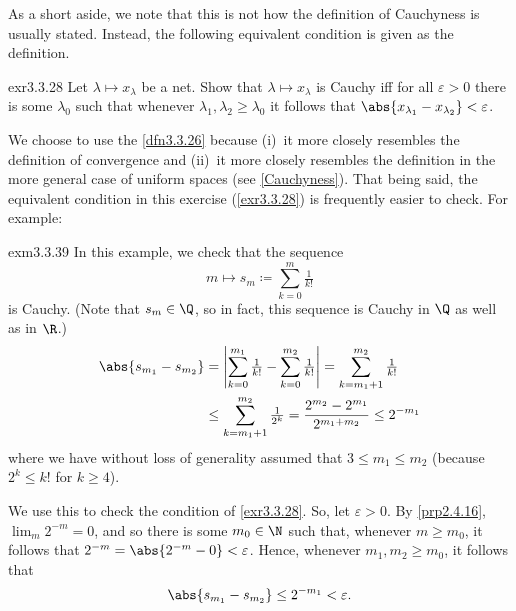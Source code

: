 As a short aside, we note that this is not how the definition of Cauchyness is usually stated.  Instead, the following equivalent condition is given as the definition.
\begin{exr}{}{exr3.3.28}
Let $\lambda \mapsto x_\lambda$ be a net.  Show that $\lambda \mapsto x_\lambda$ is Cauchy iff for all $\varepsilon >0$ there is some $\lambda _0$ such that whenever $\lambda _1,\lambda _2\geq \lambda _0$ it follows that $\abs{x_{\lambda _1}-x_{\lambda _2}}<\varepsilon$.
\end{exr}
We choose to use the \cref{dfn3.3.26} because (i)~it more closely resembles the definition of convergence and (ii)~it more closely resembles the definition in the more general case of uniform spaces (see \cref{Cauchyness}).  That being said, the equivalent condition in this exercise (\cref{exr3.3.28}) is frequently easier to check.  For example:
\begin{exm}{}{exm3.3.39}
In this example, we check that the sequence
\begin{equation}
m\mapsto s_m\coloneqq \sum _{k=0}^m\tfrac{1}{k!}
\end{equation}
is Cauchy.  (Note that $s_m\in \Q$, so in fact, this sequence is Cauchy in $\Q$ as well as in $\R$.)
\begin{equation}
\begin{split}
\abs{s_{m_1}-s_{m_2
}} & =\left| \sum _{k=0}^{m_1}\tfrac{1}{k!}-\sum _{k=0}^{m_2}\tfrac{1}{k!}\right| =\sum _{k=m_1+1}^{m_2}\tfrac{1}{k!} \\
& \leq \sum _{k=m_1+1}^{m_2}\tfrac{1}{2^k}=\frac{2^{m_2}-2^{m_1}}{2^{m_1+m_2}}\leq 2^{-m_1}
\end{split}
\end{equation}
where we have without loss of generality assumed that $3\leq m_1\leq m_2$ (because $2^k\leq k!$ for $k\geq 4$).

We use this to check the condition of \cref{exr3.3.28}.  So, let $\varepsilon >0$.  By \cref{prp2.4.16}, $\lim _m2^{-m}=0$, and so there is some $m_0\in \N$ such that, whenever $m\geq m_0$, it follows that $2^{-m}=\abs{2^{-m}-0}<\varepsilon$.  Hence, whenever $m_1,m_2\geq m_0$, it follows that
\begin{equation}
\abs{s_{m_1}-s_{m_2}}\leq 2^{-m_1}<\varepsilon .
\end{equation}
\end{exm}

